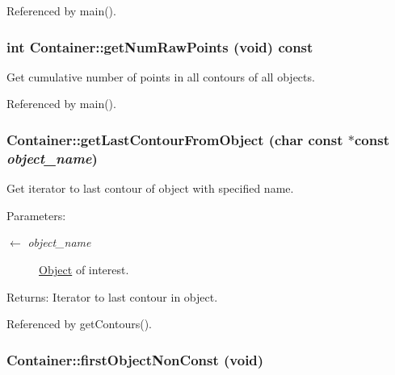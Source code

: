 Referenced by main().\hypertarget{classContainer_5475d8d32538e480fc5e840a9f64f4ff}{
\subsubsection[getNumRawPoints]{\setlength{\rightskip}{0pt plus 5cm}int Container::getNumRawPoints (void) const}}
\label{classContainer_5475d8d32538e480fc5e840a9f64f4ff}


Get cumulative number of points in all contours of all objects. 

Referenced by main().\hypertarget{classContainer_eeb8e3e0db9a84db46f9c7098f52f548}{
\subsubsection[getLastContourFromObject]{ Container::getLastContourFromObject (char const $\ast$const  {\em object\_\-name})}}
\label{classContainer_eeb8e3e0db9a84db46f9c7098f52f548}


Get iterator to last contour of object with specified name. \begin{Desc}
\item[Parameters:]
\begin{description}
\item[\mbox{$\leftarrow$} {\em object\_\-name}]\hyperlink{classObject}{Object} of interest. \end{description}
\end{Desc}
\begin{Desc}
\item[Returns:]Iterator to last contour in object. \end{Desc}


Referenced by getContours().\hypertarget{classContainer_ecb2781bea92151778ac3133c9d43f37}{
\subsubsection[firstObjectNonConst]{ Container::firstObjectNonConst (void)}}
\label{classContainer_ecb2781bea92151778ac3133c9d43f37}


